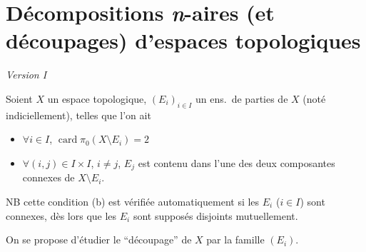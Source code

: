 \documentclass[11pt,a4paper]{article}
\begin{document}
\section{Décompositions \emph{n}-aires (et découpages) d'espaces topologiques}

 \emph{Version I}

Soient $X$ un espace topologique, $(E_i)_{i\in I}$ un ens.\ de parties
 de $X$ (noté indiciellement), telles
que l'on ait
\begin{itemize}
  \item[(a)] $\forall i\in I$, $\operatorname{card}\pi_0(X\setminus E_i)=2$
  \item[(b)] $\forall (i,j)\in I\times I$, $i\neq j$, $E_j$ est contenu dans
  l'une des deux composantes connexes de $X\setminus E_i$.
\end{itemize}
NB cette condition (b) est vérifiée automatiquement \ill{} si les $E_i$
($i\in I$) sont connexes, dès lors que les $E_i$ sont supposés disjoints
mutuellement.

On se propose d'étudier le “découpage” de $X$ par la famille $(E_i)$.
\end{document}
